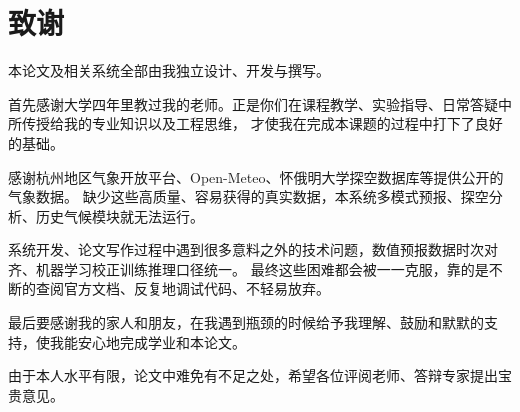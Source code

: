 \documentclass[12pt,a4paper]{ctexart}
\begin{document}
\section*{致谢}

本论文及相关系统全部由我独立设计、开发与撰写。

首先感谢大学四年里教过我的老师。正是你们在课程教学、实验指导、日常答疑中所传授给我的专业知识以及工程思维，
才使我在完成本课题的过程中打下了良好的基础。

感谢杭州地区气象开放平台、Open-Meteo、怀俄明大学探空数据库等提供公开的气象数据。
缺少这些高质量、容易获得的真实数据，本系统多模式预报、探空分析、历史气候模块就无法运行。

系统开发、论文写作过程中遇到很多意料之外的技术问题，数值预报数据时次对齐、机器学习校正训练推理口径统一。
最终这些困难都会被一一克服，靠的是不断的查阅官方文档、反复地调试代码、不轻易放弃。

最后要感谢我的家人和朋友，在我遇到瓶颈的时候给予我理解、鼓励和默默的支持，使我能安心地完成学业和本论文。

由于本人水平有限，论文中难免有不足之处，希望各位评阅老师、答辩专家提出宝贵意见。
\end{document}
